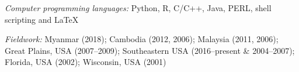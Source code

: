 \myHangIndent
{\sffamily\itshape Computer programming languages:} Python, R, C/C++, Java,
PERL, shell scripting and \LaTeX

\myHangIndent
{\sffamily\itshape Fieldwork:} Myanmar (2018); Cambodia (2012, 2006); Malaysia (2011, 2006);
Great Plains, USA (2007--2009); Southeastern USA (2016--present \& 2004--2007); Florida, USA
(2002); Wisconsin, USA (2001)
